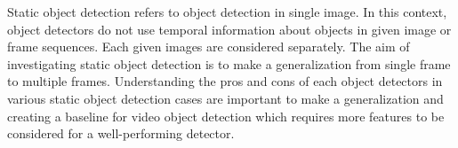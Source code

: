 \documentclass{article}
\begin{document}
\setlength{\parindent}{6ex}

\indent

Static object detection refers to object detection in single image.
In this context, object detectors do not use temporal information about
objects in given image or frame sequences. Each given images are considered
separately. The aim of investigating static object detection is to make a 
generalization from single frame to multiple frames. Understanding the pros 
and cons of each object detectors in various static object detection cases 
are important to make a generalization and creating a baseline for video 
object detection which requires more features to be considered for a well-performing 
detector. \par
\end{document}
